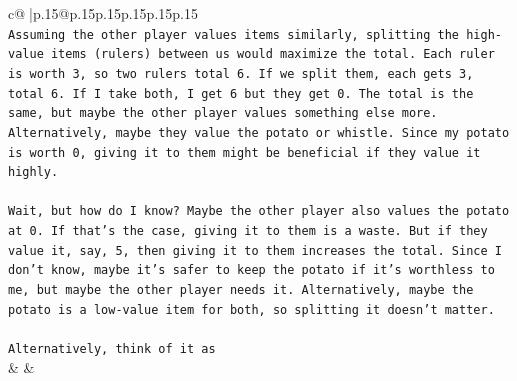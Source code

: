 \documentclass{article}
\begin{document}
{\begin{supertabular}{c@{$\;$}|p{.15\linewidth}@{}p{.15\linewidth}p{.15\linewidth}p{.15\linewidth}p{.15\linewidth}p{.15\linewidth}}
{{{\\ 
\texttt{Assuming the other player values items similarly, splitting the high{-}value items (rulers) between us would maximize the total. Each ruler is worth 3, so two rulers total 6. If we split them, each gets 3, total 6. If I take both, I get 6 but they get 0. The total is the same, but maybe the other player values something else more. Alternatively, maybe they value the potato or whistle. Since my potato is worth 0, giving it to them might be beneficial if they value it highly.} \\
\\ 
\texttt{Wait, but how do I know? Maybe the other player also values the potato at 0. If that's the case, giving it to them is a waste. But if they value it, say, 5, then giving it to them increases the total. Since I don't know, maybe it's safer to keep the potato if it's worthless to me, but maybe the other player needs it. Alternatively, maybe the potato is a low{-}value item for both, so splitting it doesn't matter.} \\
\\ 
\texttt{Alternatively, think of it as} \\
            }
        }
    }
    & & \\ \\


\end{supertabular}}
\end{document}
